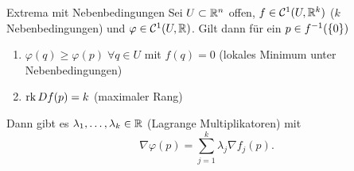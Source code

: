 \documentclass[main.tex]{subfiles}
\begin{document}
\begin{karte}{Extrema mit Nebenbedingungen}
    Sei \( U \subset \mathbb{R}^n \) offen, \( f \in \mathcal{C}^1(U, \mathbb{R}^k) \) 
    (\(k\) Nebenbedingungen) und \(\varphi \in \mathcal{C}^1(U, \mathbb{R})\).
    Gilt dann für ein \(p \in f^{-1}(\{0\})\)
    \begin{enumerate}
        \item \( \varphi(q) \geq \varphi(p) \;\forall q \in U \) mit
        \( f(q) = 0 \) (lokales Minimum unter Nebenbedingungen)
        \item \( \operatorname{rk} Df (p) = k \) (maximaler Rang)
    \end{enumerate}
    Dann gibt es \( \lambda_1, \ldots, \lambda_k \in \mathbb{R} \) (Lagrange Multiplikatoren)
    mit 
    \[ \nabla \varphi(p) = \sum_{j=1}^k \lambda_j \nabla f_j(p). \]
\end{karte}
\end{document}
